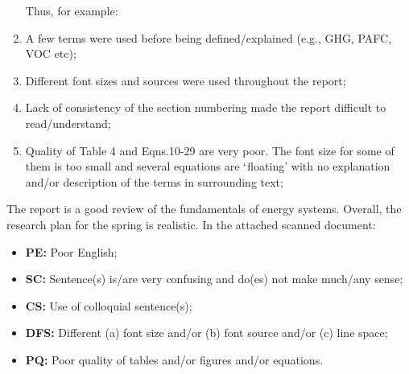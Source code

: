 \documentclass[14pt,twoside]{report}
\begin{document}
\begin{enumerate}
\begin{enumerate}
\end{enumerate}  
Thus, for example:
%
\item A few terms were used before being defined/explained (e.g., GHG, PAFC, VOC etc); 
%
\item Different font sizes and sources were used throughout the report;
%
\item Lack of consistency of the section numbering made the report difficult to read/understand;
%
\item Quality of Table 4 and Eqns.10-29 are very poor. The font size for some of them is too small and several equations are $\lq$floating' with no explanation and/or description of the terms in surrounding text;
%
% 
\end{enumerate}

The report is a good review of the fundamentals of energy systems. Overall, the research plan for the spring is realistic. In the attached scanned document:
\begin{itemize}
\item {\bf PE:} Poor English;
\item {\bf SC:} Sentence(s) is/are very confusing and do(es) not make much/any sense;
\item {\bf CS:} Use of colloquial sentence(s);
\item {\bf DFS:} Different (a) font size and/or (b) font source and/or (c) line space;
\item {\bf PQ:} Poor quality of tables and/or figures and/or equations. 
\end{itemize}
\medskip
\end{document}
